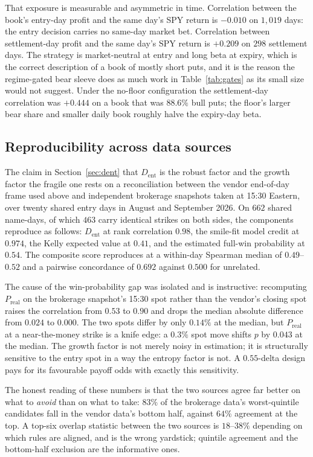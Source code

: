\documentclass[11pt]{article}
\newcommand{\dent}{D_{\mathrm{ent}}}
\newcommand{\Preal}{P_{\mathrm{real}}}
\begin{document}
That exposure is measurable and asymmetric in time. Correlation between the
book's entry-day profit and the same day's SPY return is $-0.010$ on
$1{,}019$ days: the entry decision carries no same-day market bet.
Correlation between settlement-day profit and the same day's SPY return is
$+0.209$ on $298$ settlement days. The strategy is market-neutral at entry and
long beta at expiry, which is the correct description of a book of mostly
short puts, and it is the reason the regime-gated bear sleeve does as much work
in Table~\ref{tab:gates} as its small size would not suggest. Under the
no-floor configuration the settlement-day correlation was $+0.444$ on a book
that was $88.6\%$ bull puts; the floor's larger bear share and smaller daily
book roughly halve the expiry-day beta.

\subsection{Reproducibility across data sources}
\label{sec:reproducibility}

The claim in Section~\ref{sec:dent} that $\dent$ is the robust factor and the
growth factor the fragile one rests on a reconciliation between the vendor
end-of-day frame used above and independent brokerage snapshots taken at
15:30 Eastern, over twenty shared entry days in August and September 2026.
On $662$ shared name-days, of which $463$ carry identical strikes on both
sides, the components reproduce as follows: $\dent$ at rank correlation
$0.98$, the smile-fit model credit at $0.974$, the Kelly expected value at
$0.41$, and the estimated full-win probability at $0.54$. The composite score
reproduces at a within-day Spearman median of $0.49$--$0.52$ and a pairwise
concordance of $0.692$ against $0.500$ for unrelated.

The cause of the win-probability gap was isolated and is instructive:
recomputing $\Preal$ on the brokerage snapshot's 15:30 spot rather than the
vendor's closing spot raises the correlation from $0.53$ to $0.90$ and drops
the median absolute difference from $0.024$ to $0.000$. The two spots differ
by only $0.14\%$ at the median, but $\Preal$ at a near-the-money strike is a
knife edge: a $0.3\%$ spot move shifts $p$ by $0.043$ at the median. The
growth factor is not merely noisy in estimation; it is structurally sensitive
to the entry spot in a way the entropy factor is not. A $0.55$-delta design
pays for its favourable payoff odds with exactly this sensitivity.

The honest reading of these numbers is that the two sources agree far better
on what to \emph{avoid} than on what to take: $83\%$ of the brokerage data's
worst-quintile candidates fall in the vendor data's bottom half, against
$64\%$ agreement at the top. A top-six overlap statistic between the two
sources is $18$--$38\%$ depending on which rules are aligned, and is the wrong
yardstick; quintile agreement and the bottom-half exclusion are the
informative ones.
\end{document}
